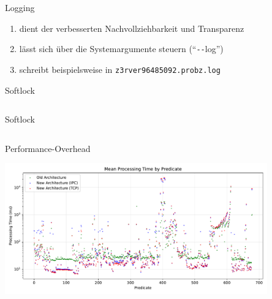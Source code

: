 \begin{frame}{Logging}
    \vspace{2em}
    \Large
    \begin{enumerate}
        \item dient der verbesserten Nachvollziehbarkeit und Transparenz
        \item lässt sich über die Systemargumente steuern (\enquote{\texttt{-}\texttt{-}log})
        \item schreibt beispielsweise in \texttt{z3rver96485092.probz.log}
    \end{enumerate}
\end{frame}

\begin{frame}[fragile]{Softlock} %
    \vspace{2em}
    \inputminted[linenos=false]{c++}{softlocka.cpp}
\end{frame}

\begin{frame}[fragile]{Softlock} %
    \vspace{2em}
    \inputminted[linenos=false]{c++}{softlockb.cpp}
\end{frame}

\begin{frame}{Performance-Overhead}
    \begin{center}
        \includegraphics[width=0.85\textwidth]{../Thesis/PerformanceEvaluation/processingtime_small.pdf}
    \end{center}
\end{frame}
